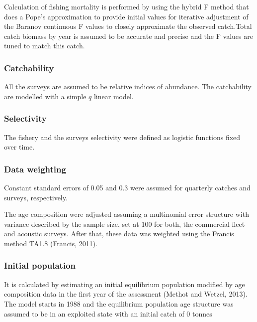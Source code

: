 \documentclass[
]{article}
\begin{document}
Calculation of fishing mortality is performed by using the hybrid F
method that does a Pope's approximation to provide initial values for
iterative adjustment of the Baranov continuous F values to closely
approximate the observed catch.Total catch biomass by year is assumed to
be accurate and precise and the F values are tuned to match this catch.

\hypertarget{catchability}{%
\subsubsection{Catchability}\label{catchability}}

All the surveys are assumed to be relative indices of abundance. The
catchability are modelled with a simple \(q\) linear model.

\hypertarget{selectivity}{%
\subsubsection{Selectivity}\label{selectivity}}

The fishery and the surveys selectivity were defined as logistic
functions fixed over time.

\hypertarget{data-weighting}{%
\subsubsection{Data weighting}\label{data-weighting}}

Constant standard errors of 0.05 and 0.3 were assumed for quarterly
catches and surveys, respectively.

The age composition were adjusted assuming a multinomial error structure
with variance described by the sample size, set at 100 for both, the
commercial fleet and acoustic surveys. After that, these data was
weighted using the Francis method TA1.8 (Francis, 2011).

\hypertarget{initial-population}{%
\subsubsection{Initial population}\label{initial-population}}

It is calculated by estimating an initial equilibrium population
modified by age composition data in the first year of the assessment
(Methot and Wetzel, 2013). The model starts in 1988 and the equilibrium
population age structure was assumed to be in an exploited state with an
initial catch of 0 tonnes
\end{document}
